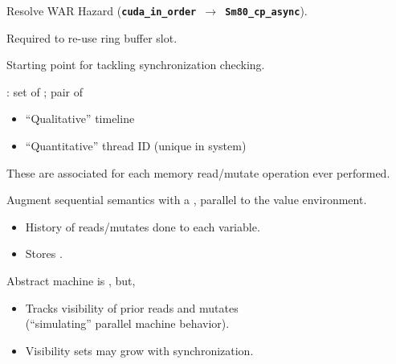 {\LARGE
Resolve WAR Hazard (\textbf{\texttt{cuda\_in\_order $\to$ Sm80\_cp\_async}}).

Required to re-use ring buffer slot.

}

\newpage
{}

{\LARGE
Starting point for tackling synchronization checking.

\vspace{5mm}

: set of ; pair of
\begin{itemize}
  \item ``Qualitative'' timeline
  \item ``Quantitative'' thread ID (unique in system)
\end{itemize}

\vspace{5mm}

These are associated for each memory read/mutate operation ever performed.

}


\newpage
{}

{\LARGE

Augment sequential semantics with a , parallel to the value environment.
\begin{itemize}
  \item History of reads/mutates done to each variable.
  \item Stores .
\end{itemize}

\vspace{5mm}

Abstract machine is , but,
\begin{itemize}
  \item Tracks visibility of prior reads and mutates\\(``simulating'' parallel machine behavior).
  \item Visibility sets may grow with synchronization.
\end{itemize}

}


\newpage
{}

